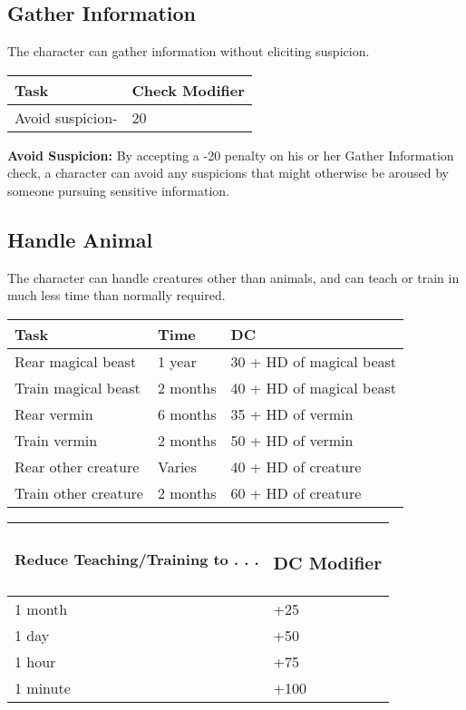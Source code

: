 \documentclass{article}
\begin{document}
\vspace{12pt}
\subsection*{Gather Information }

The character can gather information without eliciting suspicion. 

\begin{tabular}{|>{\raggedright}p{64pt}|>{\raggedright}p{66pt}|}
\hline
T\textbf{ask } & C\textbf{heck Modifier }\tabularnewline
\hline
Avoid suspicion- & 20\tabularnewline
\hline
\end{tabular}

\textbf{Avoid Suspicion:}\textit{ }By accepting a -20 penalty on his or her Gather 
Information check, a character can avoid any suspicions that might otherwise be 
aroused by someone pursuing sensitive information. 

\vspace{12pt}
\subsection*{Handle Animal }

The character can handle creatures other than animals, and can teach or train in 
much less time than normally required. 

\begin{tabular}{|>{\raggedright}p{78pt}|>{\raggedright}p{35pt}|>{\raggedright}p{101pt}|}
\hline
T\textbf{ask} & T\textbf{ime} & D\textbf{C }\tabularnewline
\hline
Rear magical beast  & 1 year & 30 + HD of magical beast \tabularnewline
\hline
Train magical beast  & 2 months & 40 + HD of magical beast \tabularnewline
\hline
Rear vermin  & 6 months & 35 + HD of vermin \tabularnewline
\hline
Train vermin  & 2 months & 50 + HD of vermin \tabularnewline
\hline
Rear other creature  & Varies & 40 + HD of creature \tabularnewline
\hline
Train other creature  & 2 months & 60 + HD of creature \tabularnewline
\hline
\end{tabular}

\vspace{12pt}
\begin{tabular}{|>{\raggedright}p{138pt}|>{\raggedright}p{53pt}|}
\hline
R\textbf{educe Teaching/Training to . . . } & \subsubsection*{D\textbf{C Modifier}}\tabularnewline
\hline
1 month & +25\tabularnewline
\hline
1 day  & +50\tabularnewline
\hline
1 hour & +75\tabularnewline
\hline
1 minute & +100\tabularnewline
\hline
\end{tabular}
\end{document}
